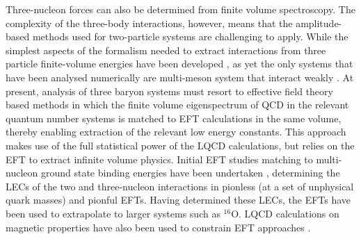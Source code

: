 Three-nucleon forces can also be determined from finite volume spectroscopy.   The complexity of the three-body interactions, however, means that the amplitude-based methods used for two-particle systems are challenging to apply. While the simplest aspects of the formalism needed to extract interactions from three particle finite-volume energies have been developed \cite{Beane:2007qr,Detmold:2008gh,Tan:2007bg,Kreuzer:2010ti,Polejaeva:2012ut,Briceno:2012rv,Hansen:2014eka}, as yet the only systems that have been analysed numerically are multi-meson system that interact weakly \cite{Beane:2007es}. At present, analysis of three baryon systems must resort to  effective field theory based methods \cite{Detmold:2012wpa,Detmold:2013wda,Detmold:2015jda,Kirscher:2015tka,Davoudi:2017ddj,Savage:2016egr} in which the finite volume eigenspectrum of QCD in the relevant quantum number systems is matched to EFT calculations in the same volume, thereby enabling extraction of the relevant low energy constants. This approach makes use of the full statistical power of the LQCD calculations, but relies on the EFT to extract infinite volume physics. Initial EFT studies matching to multi-nucleon ground state binding energies have been undertaken \cite{Barnea:2013uqa,Bansal:2017pwn,Contessi:2017rww,Gandolfi:2017arm}, determining the LECs of the two and three-nucleon interactions in pionless (at a set of unphysical quark masses) and pionful EFTs. Having determined these LECs, the EFTs have been used to extrapolate to larger systems such as $^{16}$O. LQCD calculations on magnetic properties have also been used to constrain EFT approaches \cite{Kirscher:2017fqc}.




